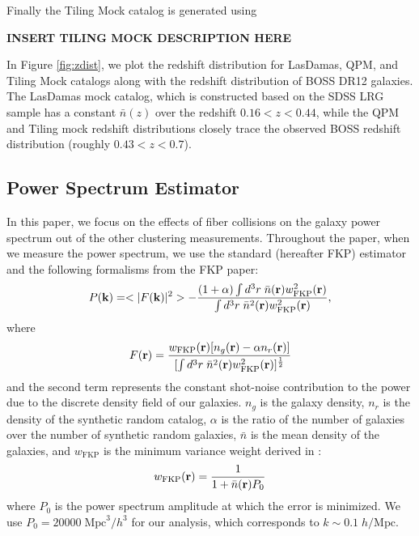 \documentclass{emulateapj}
\begin{document}
Finally the Tiling Mock catalog is generated using 

{\bf INSERT TILING MOCK DESCRIPTION HERE}

In Figure \ref{fig:zdist}, we plot the redshift distribution for LasDamas, QPM, and Tiling Mock catalogs along with the redshift distribution of BOSS DR12 galaxies. The LasDamas mock catalog, which is constructed based on the SDSS LRG sample has a constant $\bar{n}(z)$ over the redshift $0.16 < z< 0.44$, while the QPM and Tiling mock redshift distributions closely trace the observed BOSS redshift distribution (roughly $0.43 < z < 0.7$). 

\subsection{Power Spectrum Estimator} \label{sec:pk_est}
In this paper, we focus on the effects of fiber collisions on the galaxy power spectrum out of the other clustering measurements. Throughout the paper, when we measure the power spectrum, we use the standard \cite{Feldman:1994aa} (hereafter FKP) estimator and the following formalisms from the FKP paper: 
\begin{equation} \label{eq:fkppk}
P({\bf k}) = <|F({\bf k})|^2> - \frac{(1+\alpha) \int d^3r \;\bar{n}({\bf r})w_{\mathrm{FKP}}^2({\bf r})} {\int d^3r \; \bar{n}^2({\bf r})w_{\mathrm{FKP}}^2({\bf r})},
\end{equation}  
where
\begin{equation}
F({\bf r}) = \frac{w_\mathrm{FKP}({\bf r}) [n_g({\bf r}) - \alpha n_r({\bf r})]} {[\int d^3r \; \bar{n}^2({\bf r})w_\mathrm{FKP}^2({\bf r})]^{\frac{1}{2}}} 
\end{equation}
and the second term represents the constant shot-noise contribution to the power due to the discrete density field of our galaxies. $n_g$ is the galaxy density, $n_r$ is the density of the synthetic random catalog, $\alpha$ is the ratio of the number of galaxies over the number of synthetic random galaxies, $\bar{n}$ is the mean density of the galaxies, and $w_{\mathrm{FKP}}$ is the minimum variance weight derived in \cite{Feldman:1994aa}: 
\begin{equation}
w_{\mathrm{FKP}} ({\bf r}) = \frac{1}{1+\bar{n}({\bf r}) P_0}
\end{equation}
where $P_0$ is the power spectrum amplitude at which the error is minimized. We use $P_0 = 20000\; \mathrm{Mpc}^3/h^3$ for our analysis, which corresponds to $k \sim 0.1\; h/\mathrm{Mpc}$.  
\end{document}
